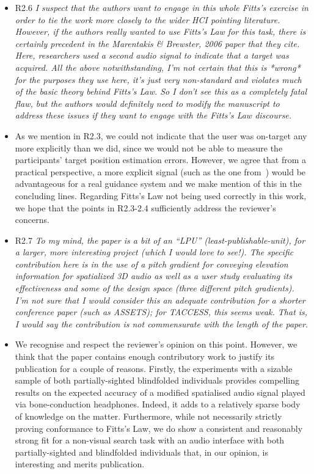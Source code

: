 \documentclass{scrartcl}
\begin{document}
\begin{itemize}
  \item R2.6 \textit{I suspect that the authors want to engage in this whole Fitts’s exercise in order to tie the work more closely to the wider HCI pointing literature. However, if the authors really wanted to use Fitts’s Law for this task, there is certainly precedent in the Marentakis \& Brewster, 2006 paper that they cite. Here, researchers used a second audio signal to indicate that a target was acquired.
    All the above notwithstanding, I’m not certain that this is *wrong* for the purposes they use here, it’s just very non-standard and violates much of the basic theory behind Fitts’s Law. So I don’t see this as a completely fatal flaw, but the authors would definitely need to modify the manuscript to address these issues if they want to engage with the Fitts’s Law discourse.}
  \item[] As we mention in R2.3, we could not indicate that the user was on-target any more explicitly than we did, since we would not be able to measure the participants' target position estimation errors.
    However, we agree that from a practical perspective, a more explicit signal (such as the one from~\cite{marentakis2005comparison}) would be advantageous for a real guidance system and we make mention of this in the concluding lines.
    Regarding Fitts's Law not being used correctly in this work, we hope that the points in R2.3-2.4 sufficiently address the reviewer's concerns.

  \item R2.7 \textit{To my mind, the paper is a bit of an ``LPU'' (least-publishable-unit), for a larger, more interesting project (which I would love to see!). The specific contribution here is in the use of a pitch gradient for conveying elevation information for spatialized 3D audio as well as a user study evaluating its effectiveness and some of the design space (three different pitch gradients). I’m not sure that I would consider this an adequate contribution for a shorter conference paper (such as ASSETS); for TACCESS, this seems weak. That is, I would say the contribution is not commensurate with the length of the paper.}
  \item[] We recognise and respect the reviewer's opinion on this point.
    However, we think that the paper contains enough contributory work to justify its publication for a couple of reasons.
    Firstly, the experiments with a sizable sample of both partially-sighted blindfolded individuals provides compelling results on the expected accuracy of a modified spatialised audio signal played via bone-conduction headphones.
    Indeed, it adds to a relatively sparse body of knowledge on the matter.
    Furthermore, while not necessarily strictly proving conformance to Fitts's Law, we do show a consistent and reasonably strong fit for a non-visual search task with an audio interface with both partially-sighted and blindfolded individuals that, in our opinion, is interesting and merits publication.

\end{itemize}
\end{document}
